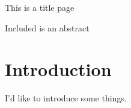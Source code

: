 \documentclass[11pt]{article}
\begin{document}
\setlength{\parindent}{2em}



\begin{titlepage}
\clearpage
\thispagestyle{empty}

This is a title page

Included is an abstract
\end{titlepage}

\tableofcontents
\newpage


\section{Introduction}
I'd like to introduce some things.
\end{document}
